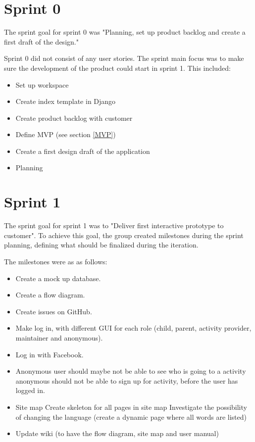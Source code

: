\section{Sprint 0}
\label{sprint0}
The sprint goal for sprint 0 was "Planning, set up product backlog and create a first draft of the design."

Sprint 0 did not consist of any user stories. The sprint main focus was to make sure the development of the product could start in sprint 1. This included:
\begin{itemize}
    \item Set up workspace
    \item Create index template in Django
    \item Create product backlog with customer
    \item Define MVP (see section \ref{MVP})
    \item Create a first design draft of the application
    \item Planning
\end{itemize}


\section{Sprint 1}
\label{sprint1}
The sprint goal for sprint 1 was to "Deliver first interactive prototype to customer". To achieve this goal, the group created milestones during the sprint planning, defining what should be finalized during the iteration. 

The milestones were as as follows:
\begin{itemize}
  \item Create a mock up database.
  \item Create a flow diagram.
  \item Create issues on GitHub.
  \item Make log in, with different GUI for each role (child, parent, activity      provider, maintainer and anonymous).
  \item Log in with Facebook.
  \item Anonymous user should maybe not be able to see who is going to a activity anonymous should not be able to sign up for activity, before the user has logged in.
  \item  Site map Create skeleton for all pages in site map Investigate the possibility of changing the language (create a dynamic page where all words are listed)
  \item Update wiki (to have the flow diagram, site map and user manual)
\end{itemize}
 
